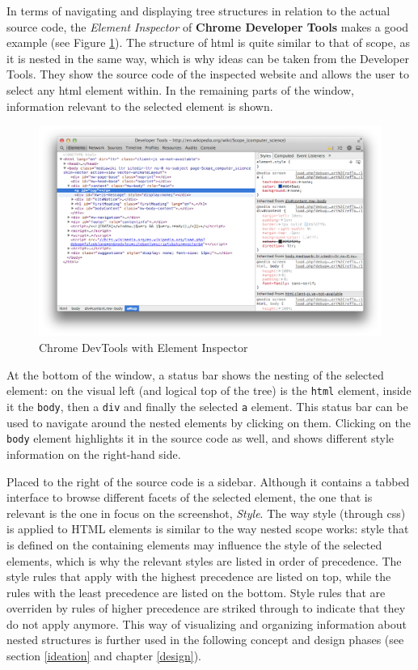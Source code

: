 In terms of navigating and displaying tree structures in relation to the
actual source code, the \emph{Element Inspector} of \textbf{Chrome
Developer Tools} makes a good example (see Figure \ref{fig:devtools}).
The structure of \acs{html} is quite similar to that of scope, as it is
nested in the same way, which is why ideas can be taken from the
Developer Tools. They show the source code of the inspected website and
allows the user to select any \acs{html} element within. In the
remaining parts of the window, information relevant to the selected
element is shown.

\begin{figure}[htbp]
\centering
\includegraphics[keepaspectratio,width=\textwidth,height=0.75\textheight]{img/devtools.png}
\caption{Chrome DevTools with Element Inspector}
\label{fig:devtools}
\end{figure}

At the bottom of the window, a status bar shows the nesting of the
selected element: on the visual left (and logical top of the tree) is
the \texttt{html} element, inside it the \texttt{body}, then a
\texttt{div} and finally the selected \texttt{a} element. This status
bar can be used to navigate around the nested elements by clicking on
them. Clicking on the \texttt{body} element highlights it in the source
code as well, and shows different style information on the right-hand
side.

Placed to the right of the source code is a sidebar. Although it
contains a tabbed interface to browse different facets of the selected
element, the one that is relevant is the one in focus on the screenshot,
\emph{Style}. The way style (through \ac{css}) is applied to HTML
elements is similar to the way nested scope works: style that is defined
on the containing elements may influence the style of the selected
elements, which is why the relevant styles are listed in order of
precedence. The style rules that apply with the highest precedence are
listed on top, while the rules with the least precedence are listed on
the bottom. Style rules that are overriden by rules of higher precedence
are striked through to indicate that they do not apply anymore. This way
of visualizing and organizing information about nested structures is
further used in the following concept and design phases (see section
\ref{ideation} and chapter \ref{design}).

